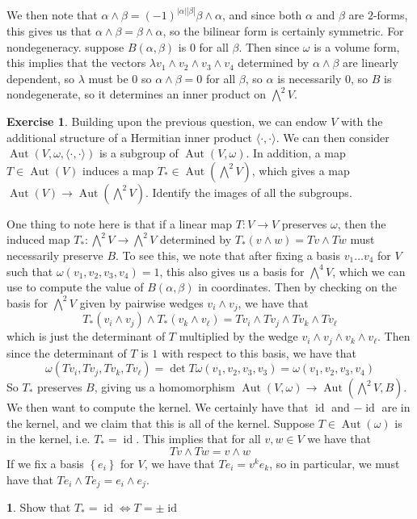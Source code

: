 \documentclass[psamsfonts]{amsart}
\theoremstyle{definition}
\newtheorem{exer}[thm]{Exercise}
\newtheorem{TODO}{\ib{TODO}}
\theoremstyle{remark}
\newcommand{\ib}[1]{\textbf{\textit{#1}}}
\newcommand{\set}[1]{\left\lbrace #1 \right\rbrace}
\DeclareMathOperator{\id}{id}
\DeclareMathOperator{\Aut}{Aut}
\begin{document}
 We then note that $\alpha \wedge \beta = (-1)^{|\alpha||\beta|} \beta \wedge \alpha$, and since both $\alpha$ and $\beta$ are $2$-forms, this gives us that $\alpha \wedge \beta = \beta \wedge \alpha$, so the bilinear form is certainly symmetric. For nondegeneracy. suppose $B(\alpha, \beta)$ is $0$ for all $\beta$. Then since $\omega$ is a volume form, this implies that the vectors $\lambda v_1 \wedge v_2 \wedge v_3 \wedge v_4$ determined by $\alpha \wedge \beta$ are linearly dependent, so $\lambda$ must be $0$ so $\alpha \wedge \beta = 0$ for all $\beta$, so $\alpha$ is necessarily $0$, so $B$ is nondegenerate, so it determines an inner product on $\bigwedge^2V$.
%
\begin{exer}
Building upon the previous question, we can endow $V$ with the additional structure of a Hermitian inner product $\langle \cdot, \cdot \rangle$. We can then consider $\Aut(V, \omega, \langle \cdot,\cdot \rangle)$ is a subgroup of $\Aut(V, \omega)$. In addition, a map $T \in \Aut(V)$ induces a map $T_* \in \Aut(\bigwedge^2V)$, which gives a map $\Aut(V) \to \Aut(\bigwedge^2V)$. Identify the images of all the subgroups. 
\end{exer}
One thing to note here is that if a linear map $T : V \to V$ preserves $\omega$, then the induced map $T_* : \bigwedge^2V \to \bigwedge^2V$ determined by $T_*(v \wedge w) = Tv \wedge Tw$ must necessarily preserve $B$. To see this, we note that after fixing a basis $v_1 \ldots v_4$ for $V$ such that $\omega(v_1, v_2, v_3, v_4) = 1$, this also gives us a basis for $\bigwedge^4V$, which we can use to compute the value of $B(\alpha,\beta)$ in coordinates. Then by checking on the basis for $\bigwedge^2V$ given by pairwise wedges $v_i \wedge v_j$, we have that 
$$T_*(v_i \wedge v_j) \wedge T_*(v_k \wedge v_\ell) = Tv_i \wedge Tv_j \wedge Tv_k \wedge Tv_\ell $$
which is just the determinant of $T$ multiplied by the wedge $v_i \wedge v_j \wedge v_k \wedge v_\ell$. Then since the determinant of $T$ is $1$ with respect to this basis, we have that 
$$\omega(Tv_i, Tv_j, Tv_k, Tv_\ell) = \det T \omega (v_1, v_2, v_3, v_3) = \omega(v_1,v_2,v_3,v_4)$$
So $T_*$ preserves $B$, giving us a homomorphism $\Aut(V, \omega) \to \Aut(\bigwedge^2V, B)$. We then want to compute the kernel. We certainly have that $\id$ and $-\id$ are in the kernel, and we claim that this is all of the kernel. Suppose $T \in \Aut(\omega)$ is in the kernel, i.e. $T_* = \id$. This implies that for all $v,w \in V$ we have that 
$$Tv \wedge Tw = v \wedge w $$
If we fix a basis $\set{e_i}$ for $V$, we have that $Te_i = v^ke_k$, so in particular, we must have that $Te_i \wedge Te_j = e_i \wedge e_j$. 
\begin{TODO}
Show that $T_* = \id \iff T = \pm \id$
\end{TODO}
\end{document}
